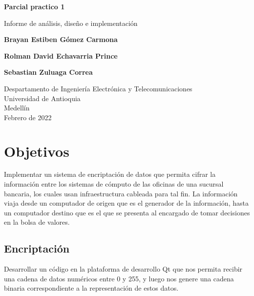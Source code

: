 \documentclass{article}
\begin{document}
\begin{titlepage}
    \begin{center}
        \vspace*{1cm}
            
        \Huge
        \textbf{Parcial practico 1}
            
        \vspace{0.5cm}
        \LARGE
        Informe de análisis, diseño e implementación
            
        \vspace{1.5cm}
            
        \textbf{Brayan Estiben Gómez Carmona}
        
        \vspace{0.5cm}
        
        \LARGE
        \textbf{Rolman David Echavarria Prince}
        
        \vspace{0.5cm}
        
        \LARGE
        \textbf{Sebastian Zuluaga Correa}

        \vfill
            
        \vspace{0.8cm}
            
        \Large
        Despartamento de Ingeniería Electrónica y Telecomunicaciones\\
        Universidad de Antioquia\\
        Medellín\\
        Febrero de 2022
            
    \end{center}
\end{titlepage}

\tableofcontents

\newpage
\section{Objetivos}\label{intro}
Implementar un sistema de encriptación de datos que permita cifrar la información entre los sistemas de cómputo de las oficinas de una sucursal bancaria, los cuales usan infraestructura cableada para tal fin. La información viaja desde un computador de origen que es el generador de la información, hasta un computador destino que es el que se presenta al encargado de tomar decisiones en la bolsa de valores.

\subsection{Encriptación}
Desarrollar un código en la plataforma de desarrollo Qt que nos permita recibir una cadena de datos numéricos entre 0 y 255, y luego nos genere una cadena binaria correspondiente a la representación de estos datos.
\end{document}
